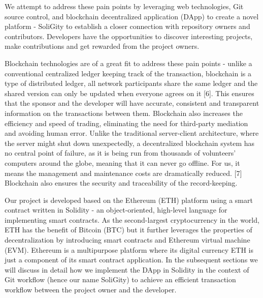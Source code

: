 \documentclass[12pt]{article}
\renewcommand{\_}{\kern-1.5pt\textunderscore\kern-1.5pt}
\begin{document}
\begin{enumerate}
\begin{enumerate}
        \end{enumerate}
        
        We attempt to address these pain points by leveraging web technologies, Git source control, and blockchain decentralized application (DApp) to create a novel platform - SoliGity to establish a closer connection with repository owners and contributors. Developers have the opportunities to discover interesting projects, make contributions and get rewarded from the project owners. \par
        
        Blockchain technologies are of a great fit to address these pain points - unlike a conventional centralized ledger keeping track of the transaction, blockchain is a type of distributed ledger, all network participants share the same ledger and the shared version can only be updated when everyone agrees on it [6]. This ensures that the sponsor and the developer will have accurate, consistent and transparent information on the transactions between them. Blockchain also increases the efficiency and speed of trading, eliminating the need for third-party mediation and avoiding human error. Unlike the traditional server-client architecture, where the server might shut down unexpectedly, a decentralized blockchain system has no central point of failure, as it is being run from thousands of volunteers’ computers around the globe, meaning that it can never go offline. For us, it means the management and maintenance costs are dramatically reduced.  [7] Blockchain also ensures the security and traceability of the record-keeping. \par
        
        Our project is developed based on the Ethereum (ETH) platform using a smart contract written in Solidity - an object-oriented, high-level language for implementing smart contracts. As the second-largest cryptocurrency in the world, ETH has the benefit of Bitcoin (BTC) but it further leverages the properties of decentralization by introducing smart contracts and Ethereum virtual machine (EVM). Ethereum is a multipurpose platform where its digital currency ETH is just a component of its smart contract application. In the subsequent sections we will discuss in detail how we implement the DApp in Solidity in the context of Git workflow (hence our name SoliGity) to achieve an efficient transaction workflow between the project owner and the developer. \par


\end{enumerate}
\end{document}
